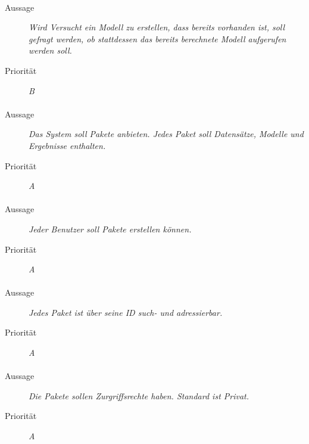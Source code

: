 \paragraph{}
\begin{description}
\item[Aussage] \textit{Wird Versucht ein Modell zu erstellen, dass bereits vorhanden ist, soll gefragt werden, ob stattdessen das bereits berechnete Modell aufgerufen werden soll.}
\item[Priorität] \textit{B}
\end{description}

\paragraph{}
\begin{description}
\item [Aussage] \textit{Das System soll Pakete anbieten. Jedes Paket soll Datensätze, Modelle und Ergebnisse enthalten.}
\item [Priorität] \textit{A}
\end{description}

\paragraph{}
\begin{description}
\item[Aussage] \textit{Jeder Benutzer soll Pakete erstellen können.}
\item[Priorität] \textit{A}
\end{description}

\paragraph{}
\begin{description}
\item[Aussage] \textit{Jedes Paket ist über seine ID such- und adressierbar.}
\item[Priorität] \textit{A}
\end{description}

\paragraph{}
\begin{description}
\item[Aussage] \textit{Die Pakete sollen Zurgriffsrechte haben. Standard ist Privat.}
\item[Priorität] \textit{A}
\end{description}


